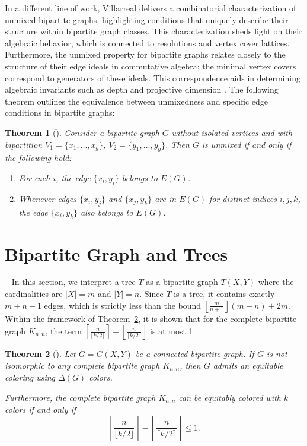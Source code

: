 \documentclass{article}
\newtheorem{theorem}{Theorem}[section]
\theoremstyle{definition}
\begin{document}
In a different line of work, Villarreal \cite{Vill2006arreal} delivers a combinatorial characterization of unmixed bipartite graphs, highlighting conditions that uniquely describe their structure within bipartite graph classes. This characterization sheds light on their algebraic behavior, which is connected to resolutions and vertex cover lattices. Furthermore, the unmixed property for bipartite graphs relates closely to the structure of their edge ideals in commutative algebra; the minimal vertex covers correspond to generators of these ideals. This correspondence aids in determining algebraic invariants such as depth and projective dimension \cite{Mohammadi2009Moradi,Bolognini2018Macchia}. The following theorem outlines the equivalence between unmixedness and specific edge conditions in bipartite graphs:

\begin{theorem}[\cite{Vill2006arreal}]\label{unmixedgraph1}
Consider a bipartite graph $G$ without isolated vertices and with bipartition $V_1 = \{x_1,\ldots,x_g\}$, $V_2 = \{y_1,\ldots,y_g\}$. Then $G$ is unmixed if and only if the following hold:
\begin{enumerate}[label={\rm(\alph*)}]
    \item For each $i$, the edge $\{x_i,y_i\}$ belongs to $E(G)$.
    \item Whenever edges $\{x_i,y_j\}$ and $\{x_j,y_k\}$ are in $E(G)$ for distinct indices $i,j,k$, the edge $\{x_i,y_k\}$ also belongs to $E(G)$.
\end{enumerate}
\end{theorem}

\section{Bipartite Graph and Trees}~\label{sec5}
In this section, we interpret a tree $T$ as a bipartite graph $T(X,Y)$ where the cardinalities are $|X| = m$ and $|Y| = n$. Since $T$ is a tree, it contains exactly $m+n-1$ edges, which is strictly less than the bound $\left\lfloor \frac{m}{n+1} \right\rfloor (m - n) + 2m$. Within the framework of Theorem~\ref{thm1Bipartite}, it is shown that for the complete bipartite graph $K_{n,n}$, the term $\left\lceil \frac{n}{\lfloor k/2 \rfloor} \right\rceil - \left\lfloor \frac{n}{\lceil k/2 \rceil} \right\rfloor$ is at most 1.

\begin{theorem}[\cite{Lih96WuPl}]\label{thm1Bipartite}
Let $G = G(X, Y)$ be a connected bipartite graph. If $G$ is not isomorphic to any complete bipartite graph $K_{n,n}$, then $G$ admits an equitable coloring using $\Delta(G)$ colors.

Furthermore, the complete bipartite graph $K_{n,n}$ can be equitably colored with $k$ colors if and only if
\[
\left\lceil \frac{n}{\lfloor k/2 \rfloor} \right\rceil - \left\lfloor \frac{n}{\lceil k/2 \rceil} \right\rfloor \leqslant 1.
\]
\end{theorem}
\end{document}

